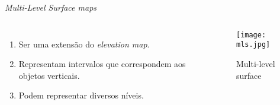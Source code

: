 \begin{frame}[t]{\textit{Multi-Level Surface maps}} 
    \transdissolve[duration=0.5]
        \begin{columns}[t]
                \begin{enumerate}
                    \item Ser uma extensão do \textit{elevation map}.
                    \item Representam intervalos que correspondem aos objetos verticais.
                    \item Podem representar diversos níveis.
                \end{enumerate}
            \begin{center}
                \begin{figure}
                    \texttt{[image: mls.jpg]}
                    \caption{Multi-level surface \cite{article}}
                \end{figure}
            \end{center}
        \end{columns}
\end{frame}

   
    

